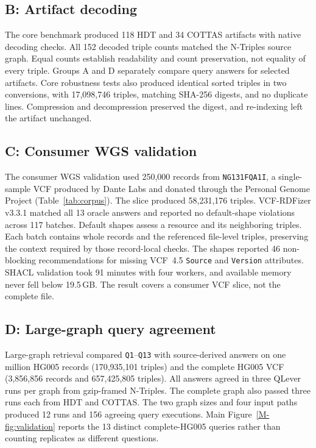 \documentclass[11pt]{article}
\begin{document}
\subsection{B: Artifact decoding}\label{subsec:validation-decoding}
The core benchmark produced 118 HDT and 34 COTTAS artifacts with native decoding checks.
All 152 decoded triple counts matched the N-Triples source graph.
Equal counts establish readability and count preservation, not equality of every triple.
Groups A and D separately compare query answers for selected artifacts.
Core robustness tests also produced identical sorted triples in two conversions, with 17,098,746 triples, matching SHA-256 digests, and no duplicate lines.
Compression and decompression preserved the digest, and re-indexing left the artifact unchanged.

\subsection{C: Consumer WGS validation}\label{subsec:validation-consumer}
The consumer WGS validation used 250,000 records from \texttt{NG131FQA1I}, a single-sample VCF produced by Dante Labs and donated through the Personal Genome Project (Table~\ref{tab:corpus}).
The slice produced 58,231,176 triples.
VCF-RDFizer v3.3.1 matched all 13 oracle answers and reported no default-shape violations across 117 batches.
Default shapes assess a resource and its neighboring triples.
Each batch contains whole records and the referenced file-level triples, preserving the context required by those record-local checks.
The shapes reported 46 non-blocking recommendations for missing VCF~4.5 \texttt{Source} and \texttt{Version} attributes.
SHACL validation took 91 minutes with four workers, and available memory never fell below 19.5\,GB.
The result covers a consumer VCF slice, not the complete file.

\subsection{D: Large-graph query agreement}\label{subsec:validation-large}
Large-graph retrieval compared \texttt{Q1}--\texttt{Q13} with source-derived answers on one million HG005 records (170,935,101 triples) and the complete HG005 VCF (3,856,856 records and 657,425,805 triples).
All answers agreed in three QLever runs per graph from gzip-framed N-Triples.
The complete graph also passed three runs each from HDT and COTTAS.
The two graph sizes and four input paths produced 12 runs and 156 agreeing query executions.
Main Figure~\ref{M-fig:validation} reports the 13 distinct complete-HG005 queries rather than counting replicates as different questions.
\end{document}
